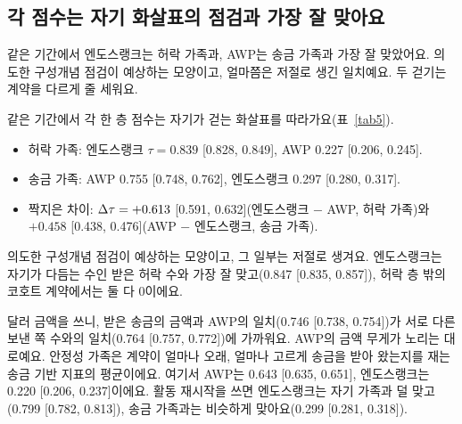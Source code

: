 \subsection{각 점수는 자기 화살표의 점검과 가장 잘 맞아요}

\begin{yoji}
같은 기간에서 엔도스랭크는 허락 가족과, AWP는 송금 가족과 가장 잘 맞았어요. 의도한 구성개념 점검이 예상하는 모양이고, 얼마쯤은 저절로 생긴 일치예요. 두 걷기는 계약을 다르게 줄 세워요.
\end{yoji}

같은 기간에서 각 한 층 점수는 자기가 걷는 화살표를 따라가요(표~\ref{tab5}).
\begin{itemize}
\item 허락 가족: 엔도스랭크 $\tau=0.839$ [0.828, 0.849], AWP 0.227 [0.206, 0.245].
\item 송금 가족: AWP 0.755 [0.748, 0.762], 엔도스랭크 0.297 [0.280, 0.317].
\item 짝지은 차이: $\Delta\tau=+0.613$ [0.591, 0.632](엔도스랭크 − AWP, 허락 가족)와 $+0.458$ [0.438, 0.476](AWP − 엔도스랭크, 송금 가족).
\end{itemize}
의도한 구성개념 점검이 예상하는 모양이고, 그 일부는 저절로 생겨요. 엔도스랭크는 자기가 다듬는 수인 받은 허락 수와 가장 잘 맞고(0.847 [0.835, 0.857]), 허락 층 밖의 코호트 계약에서는 둘 다 0이에요.

달러 금액을 쓰니, 받은 송금의 금액과 AWP의 일치(0.746 [0.738, 0.754])가 서로 다른 보낸 쪽 수와의 일치(0.764 [0.757, 0.772])에 가까워요. AWP의 금액 무게가 노리는 대로예요. 안정성 가족은 계약이 얼마나 오래, 얼마나 고르게 송금을 받아 왔는지를 재는 송금 기반 지표의 평균이에요. 여기서 AWP는 0.643 [0.635, 0.651], 엔도스랭크는 0.220 [0.206, 0.237]이에요. 활동 재시작을 쓰면 엔도스랭크는 자기 가족과 덜 맞고(0.799 [0.782, 0.813]), 송금 가족과는 비슷하게 맞아요(0.299 [0.281, 0.318]).

